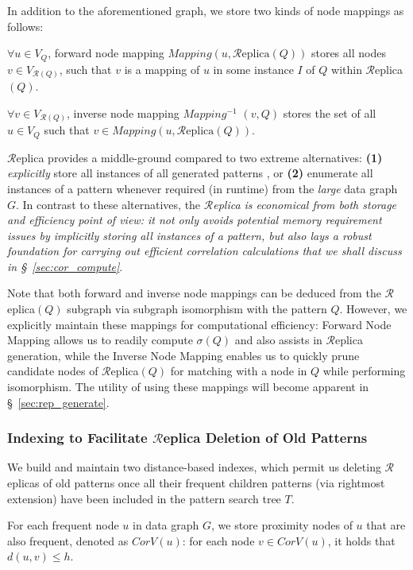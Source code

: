 In addition to the aforementioned graph, we store two kinds of node mappings as follows:

 $\forall u \in  V_Q$, forward node mapping $Mapping(u,\mathcal{R}\text{eplica}(Q))$
stores all nodes $v\in V_{\mathcal{R}(Q)}$,
such that $v$ is a mapping of $u$ in some instance $I$ of $Q$ within $\mathcal{R}$eplica$(Q)$.

  $\forall v \in V_{\mathcal{R}(Q)}$, inverse node mapping
$Mapping^{-1}$ $(v, Q)$ stores the set of all $u\in V_Q$ such
that $v\in Mapping(u,\mathcal{R}\text{eplica}(Q))$.

$\mathcal{R}$eplica provides a middle-ground compared to two extreme alternatives: {\bf (1)}
{\em explicitly} store all instances of all generated patterns \cite{KK04}, or {\bf (2)} enumerate all instances
of a pattern whenever required (in runtime) from the {\em large} data graph $G$. In contrast to these alternatives,
the {\em $\mathcal{R}$eplica is economical from both storage and efficiency point of view: it not only avoids
potential memory requirement issues by {\em implicitly} storing
all instances of a pattern, but also lays a robust foundation for carrying out
efficient correlation calculations that we shall discuss in \S~\ref{sec:cor_compute}}.

Note that both forward and inverse node mappings can be deduced from the
$\mathcal{R}$eplica$(Q)$ subgraph via subgraph isomorphism with the pattern $Q$.
However, we explicitly maintain these mappings for computational efficiency:
Forward Node Mapping allows us to readily compute $\sigma(Q)$ and also assists
in $\mathcal{R}$eplica generation, while the Inverse Node Mapping enables us to
quickly prune candidate nodes of $\mathcal{R}$eplica$(Q)$ for matching with a
node in $Q$ while performing isomorphism. The utility of using these mappings
will become apparent in \S~\ref{sec:rep_generate}.
%

%
\subsubsection{Indexing to Facilitate $\mathcal{R}$eplica Deletion of Old Patterns}
\label{sec:index}
%
We build and maintain two distance-based indexes, which permit us deleting $\mathcal{R}$eplicas of old
patterns once all their frequent children patterns (via rightmost extension) have been 
included in the pattern search tree $T$.

{} For each frequent node $u$ in data graph $G$, we
store proximity nodes of $u$ that are also frequent, denoted as $CorV(u)$: for
each node $v\in CorV(u)$, it holds that $d(u,v)\le h$.

